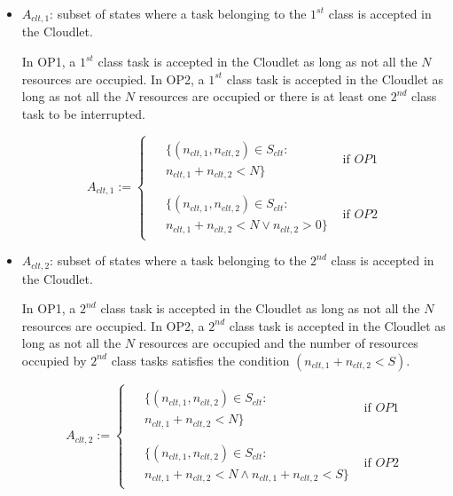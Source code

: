 \begin{itemize}
	\item $A_{clt,1}$:  subset of states where a task belonging to the $1^{st}$ class is accepted in the Cloudlet.
	
	In OP1, a $1^{st}$ class task is accepted in the Cloudlet as long as not all the $N$ resources are occupied.
	In OP2, a $1^{st}$ class task is accepted in the Cloudlet as long as not all the $N$ resources are occupied or there is at least one $2^{nd}$ class task to be interrupted.

	\begin{equation}
		A_{clt,1} :=
		\left\{
		\begin{array}{ll}
			\begin{aligned}
				& \{(n_{clt,1},n_{clt,2})\in S_{clt} : \\
				& n_{clt,1}+n_{clt,2}<N\}
			\end{aligned} & \mbox{if } OP1 \\
			\\
			\begin{aligned}
				& \{(n_{clt,1},n_{clt,2})\in S_{clt} : \\
				& n_{clt,1}+n_{clt,2}<N \vee n_{clt,2}>0\}
			\end{aligned} & \mbox{if } OP2
		\end{array}
		\right.
	\end{equation}
	
	\item $A_{clt,2}$: subset of states where  a task belonging to the $2^{nd}$ class is accepted in the Cloudlet.
	
	In OP1, a $2^{nd}$ class task is accepted in the Cloudlet as long as not all the $N$ resources are occupied.
	In OP2, a $2^{nd}$ class task is accepted in the Cloudlet as long as not all the $N$ resources are occupied and the number of resources occupied by $2^{nd}$ class tasks satisfies the condition $(n_{clt,1}+n_{clt,2}<S)$.
	
	\begin{equation}
		A_{clt,2} :=
		\left\{
		\begin{array}{ll}
			\begin{aligned}
				& \{(n_{clt,1},n_{clt,2})\in S_{clt} : \\
				& n_{clt,1}+n_{clt,2}<N\}
			\end{aligned} & \mbox{if } OP1 \\
			\\
			\begin{aligned}
				& \{(n_{clt,1},n_{clt,2})\in S_{clt} : \\
				& n_{clt,1}+n_{clt,2}<N \wedge n_{clt,1} + n_{clt,2}<S\}
			\end{aligned} & \mbox{if } OP2
		\end{array}
		\right.
	\end{equation}
	

\end{itemize}
